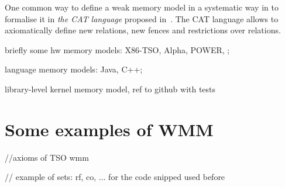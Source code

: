 One common way to define a weak memory model in a systematic way in to formalise it in \textit{the CAT language} proposed in~\cite{alglave2016syntax}. The CAT language allows to axiomatically define new relations, new fences and restrictions over relations.




briefly some hw memory models: X86-TSO, Alpha, POWER, ;

language memory models: Java, C++;

library-level kernel memory model, ref to github with tests



\section{Some examples of WMM}

//axioms of TSO wmm

// example of sets: rf, co, ... for the code snipped used before

